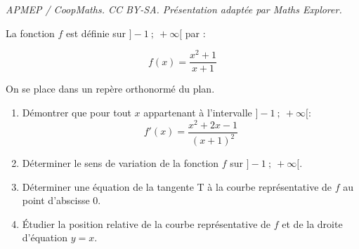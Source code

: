 \documentclass[10pt]{article}
\begin{document}
\noindent\textit{APMEP / CoopMaths. CC BY-SA. Présentation adaptée par Maths Explorer.}\par\medskip
\medskip

La fonction $f$ est définie sur $]-1~;~+\infty[$ par :

\[f(x) =\dfrac{ x^2 + 1}{x + 1}\]

On se place dans un repère orthonormé du plan.

\begin{enumerate}
\item  Démontrer que pour tout $x$ appartenant à l’intervalle $]-1~;~ +\infty[$:
\[f'(x) =\dfrac{x^2 + 2x - 1}{(x + 1)^2}\]
\item Déterminer le sens de variation de la fonction $f$ sur $]-1~;~+\infty[$.
\item Déterminer une équation de la tangente T à la courbe représentative
de $f$ au point d’abscisse $0$.
\item Étudier la position relative de la courbe représentative de $f$ et de la
droite d'équation $y = x$.
\end{enumerate}

\vspace{1cm}
\end{document}
